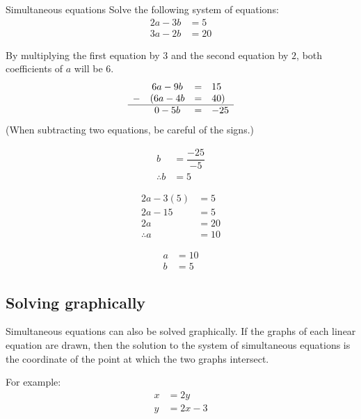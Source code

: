 \begin{wex}
{Simultaneous equations }
{Solve the following system of equations:
\begin{align*}
  2a - 3b &= 5 \\
  3a-2b &= 20
\end{align*}
}
{
By multiplying the first equation by $3$ and the second equation by $2$, both coefficients of $a$ will be $6$.
\begin{equation*}
  \begin{array}{cccc}
    \hfill & 6a-9b& =& 15\hfill \\ 
    \hfill- & (6a-4b& =& 40)\hfill \\
    \hline
    \hfill & 0 - 5b &=& -25 
  \end{array}
\end{equation*}
(When subtracting two equations, be careful of the signs.)

\begin{align*}
  b &= \dfrac{-25}{-5} \\
  \therefore b &= 5
\end{align*}

\begin{align*}
  2a - 3(5) &= 5 \\
  2a-15 &= 5 \\
  2a &= 20 \\
  \therefore a &= 10 
\end{align*}


\begin{align*}
  a &= 10 \\
  b &= 5
\end{align*}
}
\end{wex}


\subsection*{Solving graphically}

Simultaneous equations can also be solved graphically. If the graphs of each linear equation are drawn, then the solution to the system of simultaneous equations is the coordinate of the point at which the two graphs intersect.\par 
For example:
\begin{align*}
  x &= 2y \\  
  y &= 2x-3
\end{align*}

